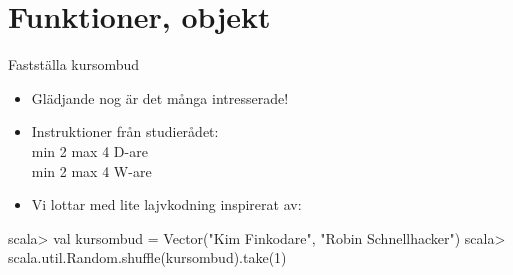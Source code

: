 \documentclass{lecturenotes}
\renewcommand{\vecka}{3}
\newcommand{\veckotema}{Funktioner, objekt}
\begin{document}
\frame{\titlepage}
\setnextsection{\vecka}
\section[Vecka \vecka: \veckotema]{\veckotema}
\frame{\tableofcontents}

\ifkompendium\else

\begin{Slide}{Fastställa kursombud}
\begin{itemize}
\item Glädjande nog är det många intresserade!
\item Instruktioner från studierådet: \\ min 2 max 4 D-are \\ min 2 max 4 W-are
\item Vi lottar med lite lajvkodning inspirerat av:
\end{itemize}
\begin{REPL}
scala> val kursombud = Vector("Kim Finkodare", "Robin Schnellhacker")
scala> scala.util.Random.shuffle(kursombud).take(1)
\end{REPL} 
\end{Slide}


\fi
\end{document}
